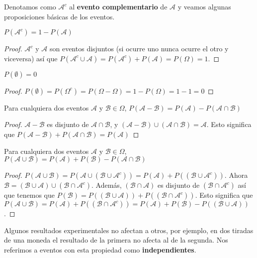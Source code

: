 Denotamos como $\mathcal{A}^{c}$ al \textbf{evento complementario} de $\mathcal{A}$ y veamos algunas proposiciones básicas de los eventos.
\begin{proposicion}
$P(\mathcal{A}^{c})=1-P(\mathcal{A})$
\end{proposicion}
\begin{proof}
$\mathcal{A}^{c}$ y $\mathcal{A}$ son eventos disjuntos (si ocurre uno nunca ocurre el otro y viceversa) así que $P(\mathcal{A}^{c} \cup \mathcal{A})=P(\mathcal{A}^{c})+P(\mathcal{A})=P(\Omega)=1$.
\end{proof}
\begin{proposicion}
$P(\emptyset)=0$
\end{proposicion}
\begin{proof}
$P(\emptyset)=P(\Omega^{c})=P(\Omega - \Omega)=1-P(\Omega)=1-1=0$
\end{proof}
\begin{proposicion}
Para cualquiera dos eventos $\mathcal{A}$ y $\mathcal{B} \in \Omega$, $P(\mathcal{A}-\mathcal{B})=P(\mathcal{A})-P(\mathcal{A} \cap \mathcal{B})$
\end{proposicion}
\begin{proof}
$\mathcal{A}-\mathcal{B}$ es disjunto de $\mathcal{A} \cap \mathcal{B}$, y $(\mathcal{A}-\mathcal{B}) \cup (\mathcal{A} \cap \mathcal{B})=\mathcal{A}$. Esto significa que $P(\mathcal{A}-\mathcal{B})+P(\mathcal{A} \cap \mathcal{B})=P(\mathcal{A})$
\end{proof}
\begin{proposicion}
Para cualquiera dos eventos $\mathcal{A}$ y $\mathcal{B} \in \Omega$, $P(\mathcal{A} \cup \mathcal{B})=P(\mathcal{A}) + P(\mathcal{B})-P(\mathcal{A} \cap \mathcal{B})$
\end{proposicion}
\begin{proof}
$P(\mathcal{A} \cup \mathcal{B})=P(\mathcal{A} \cup (\mathcal{B} \cup \mathcal{A}^{c}))=P(\mathcal{A})+P((\mathcal{B} \cup \mathcal{A}^{c}))$. Ahora $\mathcal{B}=(\mathcal{B} \cup \mathcal{A})\cup (\mathcal{B} \cap \mathcal{A}^{c})$. Además, $(\mathcal{B} \cap \mathcal{A})$ es disjunto de $(\mathcal{B} \cap \mathcal{A}^{c})$ así que tenemos que $P(\mathcal{B})=P((\mathcal{B} \cup \mathcal{A})) + P((\mathcal{B} \cap \mathcal{A}^{c}))$. Esto significa que $P(\mathcal{A} \cup \mathcal{B})=P(\mathcal{A})+P((\mathcal{B} \cap \mathcal{A}^{c}))=P(\mathcal{A})+P(\mathcal{B})-P((\mathcal{B} \cup \mathcal{A}))$.
\end{proof}
Algunos resultados experimentales no afectan a otros, por ejemplo, en dos tiradas de una moneda el resultado de la primera no afecta al de la segunda. Nos referimos a eventos con esta propiedad como \textbf{independientes}.
